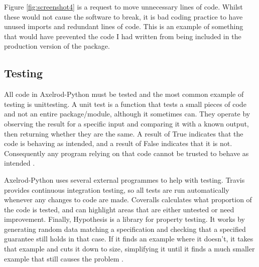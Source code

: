 Figure \ref{fig:screenshot4} is a request to move unnecessary lines of code.
Whilst these would not cause the software to break, it is bad coding practice to have unused imports and redundant lines of code.
This is an example of something that would have prevented the code I had written from being included in the production version of the package.

\subsection{Testing}
All code in Axelrod-Python must be tested and the most common example of testing is unittesting.
A unit test is a function that tests a small pieces of code and not an entire package/module, although it sometimes can.
They operate by observing the result for a specific input and comparing it with a known output, then returning whether they are the same.
A result of True indicates that the code is behaving as intended, and a result of False indicates that it is not.
Consequently any program relying on that code cannot be trusted to behave as intended \cite{Sarma2016, Williams}.

Axelrod-Python uses several external programmes to help with testing.
Travis \cite{Travis} provides continuous integration testing, so all tests are run automatically whenever any changes to code are made.
Coveralls \cite{Coveralls} calculates what proportion of the code is tested, and can highlight areas that are either untested or need improvement.
Finally, Hypothesis \cite{Hypothesis3.6.1} is a library for property testing.
It works by generating random data matching a specification and checking that a specified guarantee still holds in that case.
If it finds an example where it doesn’t, it takes that example and cuts it down to size, simplifying it until it finds a much smaller example that still causes the problem \cite{HypothesisDocs}.
